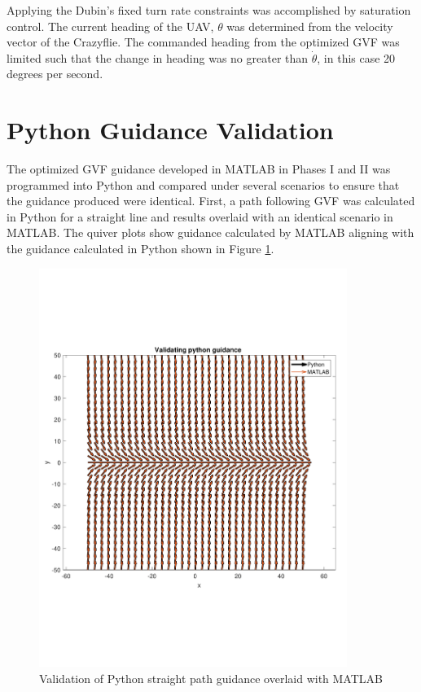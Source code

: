 \documentclass[numbered,pdftex]{ohio-etd}
\begin{document}
Applying the Dubin's fixed turn rate constraints was accomplished by saturation control. The current heading of the UAV, $\theta$ was determined from the velocity vector of the Crazyflie. The commanded heading from the optimized GVF was limited such that the change in heading was no greater than $\dot{\theta}$, in this case 20  degrees  per  second.
 
 \section{Python Guidance Validation}

The optimized GVF guidance developed in MATLAB in Phases I and II was programmed into Python and compared under several scenarios to ensure that the guidance produced were identical. First, a path following GVF was calculated in Python for a straight line and results overlaid with an identical scenario in MATLAB. The quiver plots show guidance calculated by MATLAB aligning with the guidance calculated in Python shown in Figure \ref{fig:valPythonStraightPath}.

\begin{figure}[H]
	\centering
	\includegraphics[trim=0 150 0 150,clip,width=10cm]{PaperFigures/Methods/resultsPython/PathConfirm}
	\caption{Validation of Python straight path guidance overlaid with MATLAB}
	\label{fig:valPythonStraightPath}
\end{figure}
\end{document}
